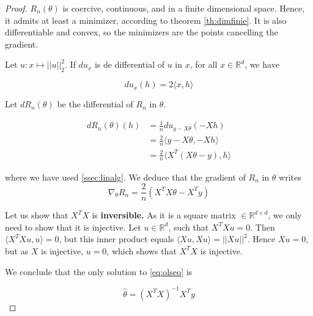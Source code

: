 \documentclass[
10pt, %
a4paper, %
oneside, %
headinclude,footinclude, %
BCOR5mm, %
]{scrartcl}
\begin{document}
\begin{proof}

    $R_n(\theta)$ is coercive, continuous, and in a finite dimensional space. Hence, it admits at least a minimizer, according to theorem \ref{th:dimfinie}.  It is also differentiable and convex, so the minimizers are the points cancelling the gradient.

    Let $u:x\mapsto ||u||_2^2$. If $du_x$ is de differential of $u$ in $x$, for all $x\in \mathbb{R}^d$, we have

    \begin{equation*}
	du_x(h) = 2\langle x,h\rangle
    \end{equation*}

    Let $dR_n(\theta)$ be the differential of $R_n$ in $\theta$.

    \begin{equation*}
	\begin{aligned}
	    dR_n(\theta)(h) &= \frac{1}{n} du_{y-X\theta}(-Xh)\\
	    &= \frac{2}{n} \langle y-X\theta, -Xh \rangle\\
	    &= \frac{2}{n} \langle X^T(X\theta-y), h \rangle
	\end{aligned}
    \end{equation*}

    where we have used \ref{ssec:linalg}. We deduce that the gradient of $R_n$ in $\theta$ writes
    \begin{equation}
	\label{eq:olseq}
        \nabla_{\theta} R_n = \frac{2}{n} (X^TX\theta-X^Ty)
    \end{equation}

    Let us show that $X^TX$ is \textbf{{inversible.}} As it is a square matrix $\in \mathbb{R}^{d\times d}$, we only need to show that it is injective. Let $u\in \mathbb{R}^d$, such that $X^TXu = 0$. Then $ \langle X^TXu, u \rangle=0$, but this inner product equals $\langle Xu, Xu \rangle = ||Xu||^2$. Hence $Xu=0$, but as $X$ is injective, $u=0$, which shows that $X^TX$ is injective.

    We conclude that the only solution to \ref{eq:olseq} is 

    \begin{equation*}
	\hat{\theta} = (X^TX)^{-1}X^Ty
    \end{equation*}



\end{proof}
\end{document}
